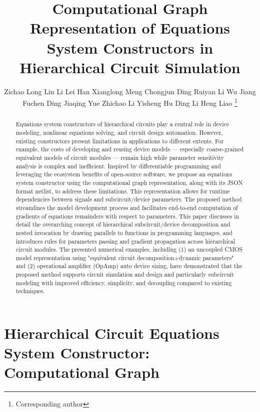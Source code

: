 \documentclass{article}
\title{Computational Graph Representation of Equations System Constructors in Hierarchical Circuit Simulation}
\author{Zichao Long
\And
Lin Li
\And
Lei Han
\And
Xianglong Meng
\And
Chongjun Ding
\And
Ruiyan Li
\And
Wu Jiang
\And
Fuchen Ding
\And
Jiaqing Yue
\And
Zhichao Li
\And
Yisheng Hu
\And
Ding Li
\And
Heng Liao
\thanks{Corresponding author}
\AND
\normalfont{HiSilicon}
}
\begin{document}
\maketitle
\begin{abstract}
  Equations system constructors of hierarchical circuits play a central role in
  device modeling, nonlinear equations solving, and circuit design automation.
  However, existing constructors present limitations in applications to different
  extents. For example, the costs of developing and reusing device models ---
  especially coarse-grained equivalent models of circuit modules ---
  remain high while parameter sensitivity analysis is complex and inefficient.
  Inspired by differentiable programming and
  leveraging the ecosystem benefits of open-source software, we propose
  an equations system constructor using the computational graph representation,
  along with its JSON format netlist, to address these limitations.
  This representation allows for runtime dependencies between signals and
  subcircuit/device parameters. The proposed method streamlines the model
  development process and facilitates end-to-end computation of gradients of
  equations remainders with respect to parameters.
  This paper discusses in detail the overarching concept of hierarchical
  subcircuit/device decomposition and nested invocation by drawing parallels to
  functions in programming languages, and introduces
  rules for parameters passing and gradient propagation across
  hierarchical circuit modules.
  The presented numerical examples, including (1) an uncoupled CMOS model
  representation using "equivalent circuit decomposition+dynamic parameters"
  and (2) operational amplifier (OpAmp) auto device sizing, have demonstrated
  that the proposed method supports circuit simulation and design and
  particularly subcircuit modeling with improved efficiency, simplicity,
  and decoupling compared to existing techniques.
\end{abstract}

\newpage
\tableofcontents

\newpage

\section[Hierarchical Circuit Equations System Constructor: Computational Graph]{Hierarchical Circuit Equations System Constructor: \\ Computational Graph}\label{sec:Joanna}

\end{document}
